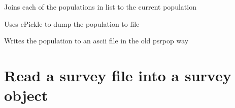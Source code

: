 \documentclass[letterpaper,10pt,english]{sphinxmanual}
\begin{document}

\begin{fulllineitems}
\label{\detokenize{module-level-docs:population.Population.join}}
\pysigstartsignatures
\pysiglinewithargsret
{}
{}
{}
\pysigstopsignatures
\sphinxAtStartPar
Joins each of the populations in list  to the current population

\end{fulllineitems}


\begin{fulllineitems}
\label{\detokenize{module-level-docs:population.Population.write}}
\pysigstartsignatures
\pysiglinewithargsret
{}
{}
{}
\pysigstopsignatures
\sphinxAtStartPar
Uses cPickle to dump the population to file 

\end{fulllineitems}


\begin{fulllineitems}
\label{\detokenize{module-level-docs:population.Population.write_asc}}
\pysigstartsignatures
\pysiglinewithargsret
{}
{}
{}
\pysigstopsignatures
\sphinxAtStartPar
Writes the population to an ascii file in the old psrpop way

\end{fulllineitems}



\section{{\hyperref[\detokenize{module-level-docs:module-survey}]{}} \textendash{} Read a survey file into a survey object}
\label{\detokenize{module-level-docs:module-survey}}\label{\detokenize{module-level-docs:survey-read-a-survey-file-into-a-survey-object}}\label{\detokenize{module-level-docs:survey-module-docs}}
\end{document}
